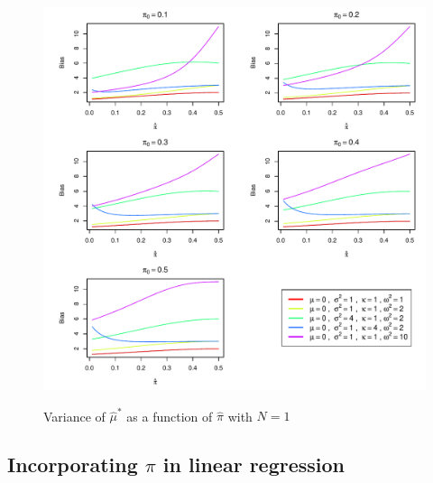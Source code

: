 \documentclass[12pt]{article}
\begin{document}
\begin{figure}[htbp]
\begin{center}
\caption{Variance of $\hat{\mu}^*$ as a function of $\hat{\pi}$ with $N=1$}
\vspace{5pt}
\includegraphics[width=\textwidth]{./Figures/var_plot.pdf}
\label{var_plot}
\end{center}
\end{figure}





\subsection{Incorporating $\pi$ in linear regression}
\end{document}

